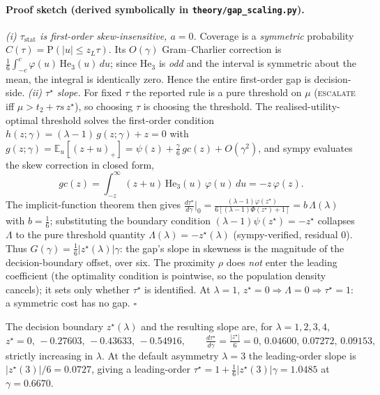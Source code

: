 \paragraph{Proof sketch (derived symbolically in \texttt{theory/gap\_scaling.py}).}
\emph{(i) $\tau_{\mathrm{stat}}$ is first-order skew-insensitive, $a=0$.} Coverage is a
\emph{symmetric} probability $C(\tau)=\mathrm{P}(|u|\le z_L\tau)$. Its $O(\gamma)$ Gram--Charlier
correction is $\tfrac16\int_{-c}^{c}\varphi(u)\,\mathrm{He}_3(u)\,du$; since $\mathrm{He}_3$ is
\emph{odd} and the interval is symmetric about the mean, the integral is identically zero. Hence the
entire first-order gap is decision-side.
\emph{(ii) $\tau^\star$ slope.} For fixed $\tau$ the reported rule is a pure threshold on $\mu$
(\textsc{escalate} iff $\mu>t_2+\tau s\,z^\star$), so choosing $\tau$ is choosing the threshold. The
realised-utility-optimal threshold solves the first-order condition
$h(z;\gamma)=(\lambda-1)\,g(z;\gamma)+z=0$ with
$g(z;\gamma)=\mathbb{E}_u[(z+u)_+]=\psi(z)+\tfrac{\gamma}{6}\,gc(z)+O(\gamma^2)$, and sympy evaluates
the skew correction in closed form,
\begin{equation}
gc(z)=\int_{-z}^{\infty}(z+u)\,\mathrm{He}_3(u)\,\varphi(u)\,du = -z\,\varphi(z).
\label{eq:gc}
\end{equation}
The implicit-function theorem then gives
$\tfrac{d\tau^\star}{d\gamma}\big|_0=\tfrac{(\lambda-1)\varphi(z^\star)}{6[(\lambda-1)\Phi(z^\star)+1]}=b\,\Lambda(\lambda)$
with $b=\tfrac16$; substituting the boundary condition $(\lambda-1)\psi(z^\star)=-z^\star$ collapses
$\Lambda$ to the pure threshold quantity $\Lambda(\lambda)=-z^\star(\lambda)$ (sympy-verified, residual
$0$). Thus $G(\gamma)=\tfrac16|z^\star(\lambda)|\gamma$: the gap's slope in skewness is the magnitude
of the decision-boundary offset, over six. The proximity $\rho$ does \emph{not} enter the leading
coefficient (the optimality condition is pointwise, so the population density cancels); it sets only
whether $\tau^\star$ is identified. At $\lambda=1$, $z^\star=0\Rightarrow\Lambda=0\Rightarrow
\tau^\star=1$: a symmetric cost has no gap. \hfill$\square$

The decision boundary $z^\star(\lambda)$ and the resulting slope are, for $\lambda=1,2,3,4$,
\begin{equation}
z^\star = 0,\,-0.27603,\,-0.43633,\,-0.54916,
\qquad
\tfrac{d\tau^\star}{d\gamma}=\tfrac{|z^\star|}{6}=0,\,0.04600,\,0.07272,\,0.09153 ,
\label{eq:zstargrid}
\end{equation}
strictly increasing in $\lambda$. At the default asymmetry $\lambda=3$ the leading-order slope is
$|z^\star(3)|/6=0.0727$,
giving a leading-order $\tau^\star=1+\tfrac16|z^\star(3)|\gamma=1.0485$ at $\gamma=0.6670$.

